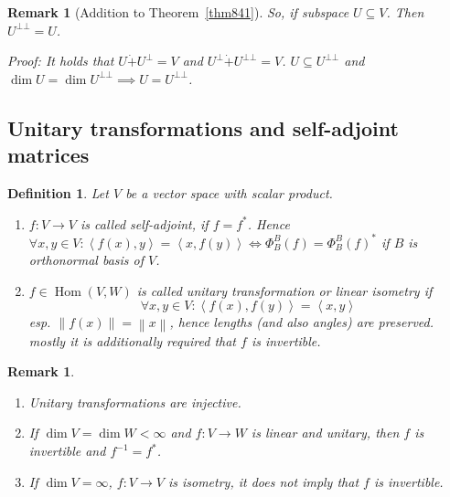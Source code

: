 \documentclass[a4paper]{article}
\newcounter{lecref}[section]
\numberwithin{lecref}{section}
\newtheorem{definition}[lecref]{Definition}
\newtheorem{remark}[lecref]{Remark}
\newtheorem*{Remark}{Remark}
\newcommand{\ip}[2]{\left\langle#1,#2\right\rangle} %
\newcommand{\norm}[1]{\left\|#1\right\|}
\DeclareMathOperator{\Hom}{Hom}
\begin{document}
\begin{Remark}[Addition to Theorem~\ref{thm841}]
  So, if subspace $U \subseteq V$. Then $U^{\bot\bot} = U$.

  Proof: It holds that $U \dot{+} U^\bot = V$ and $U^\bot \dot{+} U^{\bot\bot} = V$.
  $U \subseteq U^{\bot\bot}$ and $\dim{U} = \dim{U}^{\bot\bot} \implies U = U^{\bot\bot}$.
\end{Remark}

\subsection{Unitary transformations and self-adjoint matrices}
\begin{definition} %
  Let $V$ be a vector space with scalar product.
  \begin{enumerate}
    \item $f: V \to V$ is called \emph{self-adjoint}, if $f = f^*$.
      Hence $\forall x, y \in V: \ip{f(x)}{y} = \ip{x}{f(y)} \iff \Phi_B^B(f) = \Phi_B^B(f)^*$
      if $B$ is orthonormal basis of $V$.
    \item
      $f \in \Hom(V,W)$ is called \emph{unitary transformation} or \emph{linear isometry} if
      \[ \forall x,y \in V: \ip{f(x)}{f(y)} = \ip{x}{y} \]
      esp. $\norm{f(x)} = \norm{x}$, hence lengths (and also angles) are preserved. \\
      \emph{mostly} it is additionally required that $f$ is invertible.
  \end{enumerate}
\end{definition}

\begin{remark} %
  \label{bem868}
  \begin{enumerate}
    \item Unitary transformations are injective.
    \item If $\dim{V} = \dim{W} < \infty$ and $f: V \to W$ is linear and unitary,
    then $f$ is invertible and $f^{-1} = f^*$.
    \item If $\dim{V} = \infty$, $f: V \to V$ is isometry, it does not imply that $f$ is invertible.
  \end{enumerate}
\end{remark}
\end{document}
